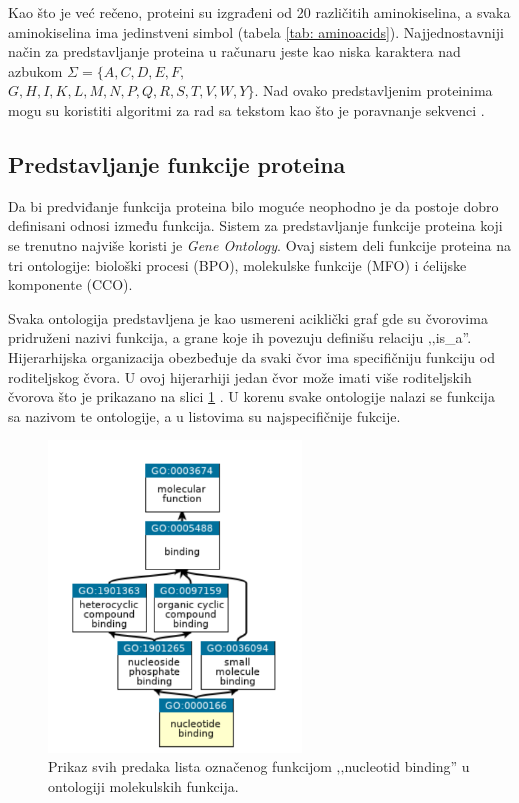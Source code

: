 
Kao što je već rečeno, proteini su izgrađeni od 20 različitih aminokiselina, a svaka aminokiselina ima jedinstveni simbol (tabela \ref{tab: aminoacids}). Najjednostavniji način za predstavljanje proteina u računaru jeste kao niska karaktera nad azbukom $\Sigma = \{A, C, D, E, F,$ \\ $ G, H, I, K, L, M, N, P, Q, R, S, T, V, W, Y\}$. Nad ovako predstavljenim proteinima mogu su koristiti algoritmi za rad sa tekstom kao što je poravnanje sekvenci \cite{radivojac}.


\subsection{Predstavljanje funkcije proteina}

Da bi predviđanje funkcija proteina bilo moguće neophodno je da postoje dobro definisani odnosi između funkcija. Sistem za predstavljanje funkcije proteina koji se trenutno najviše koristi je \textit{Gene Ontology}. Ovaj sistem deli funkcije proteina na tri ontologije: biološki procesi (BPO), molekulske funkcije (MFO) i ćelijske komponente (CCO). 


Svaka ontologija predstavljena je kao usmereni aciklički graf gde su čvorovima pridruženi nazivi funkcija, a grane koje ih povezuju definišu relaciju ‚‚is\_a''. Hijerarhijska organizacija obezbeđuje da svaki čvor ima specifičniju funkciju od roditeljskog čvora. U ovoj hijerarhiji jedan čvor može imati više roditeljskih čvorova što je prikazano na slici \ref{fig:subgraph} \cite{doktJK, GO}. U korenu svake ontologije nalazi se funkcija sa nazivom te ontologije, a u listovima su najspecifičnije fukcije.


\begin{figure}[h]
	\centering
	\includegraphics[width=0.6\textwidth]{Figures/go_subgraph.png}
	\caption{Prikaz svih predaka lista označenog funkcijom ‚‚nucleotid binding'' u ontologiji molekulskih funkcija.}
	\label{fig:subgraph}
\end{figure}


